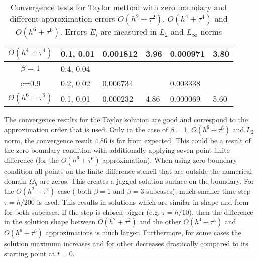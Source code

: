 \documentclass{article}
\begin{document}
\begin{table}[ht]
\begin{tabular}{||c|l|ll|ll||}
       $O(h^4+ \tau^4)$ &0.1, 0.01   &0.001812 & 3.96  & 0.000971  & 3.80  \\
    \hline
  $\beta=1$     &0.4, 0.04   &            &          &                  &      \\
      c=0.9                    &0.2, 0.02   &0.006734 &           & 0.003338      &       \\
     $O(h^6+ \tau^6)$ &0.1, 0.01 & 0.000232 &4.86 & 0.000069  & 5.60        \\
	   \hline
			\hline 
		\end{tabular}
		\caption{Convergence tests for Taylor method with zero boundary and different approximation errors $O(h^{2} + \tau^2 )$, $O(h^{4} + \tau^4 )$ and $O(h^{6} + \tau^6 )$. Errors $E_i$ are measured in $L_2$ and $L_\infty$ norms}
\label{table:A}
\end{table}

The convergence results for the Taylor solution are good and correspond to the approximation order that is used. Only in the case of $\beta = 1$, $O(h^6 + \tau^6)$ and $L_2$ norm, the convergence result $4.86$ is far from expected. This could be a result of the zero boundary condition with additionally applying seven point finite difference (for the $O(h^6 + \tau^6)$ approximation). When using zero boundary condition all points on the finite difference stencil that are outside the numerical domain $\Omega_h$ are zeros. This creates a jagged solution surface on the boundary. For the $O(h^2 + \tau^2)$ case ( both $\beta = 1$ and $\beta = 3$ subcases), much smaller time step  $\tau = h/200$ is used. This results in solutions which are similar in shape and form for both subcases. If the step is chosen bigger (e.g. $\tau = h/10$), then the difference in the solution shape between $O(h^2 + \tau^2)$ and the other $O(h^4 + \tau^4)$ and $O(h^6 + \tau^6)$ approximations is much larger. Furthermore, for some cases the solution maximum increases and for other decreases drastically compared to its starting point at $t=0$.
\end{document}
